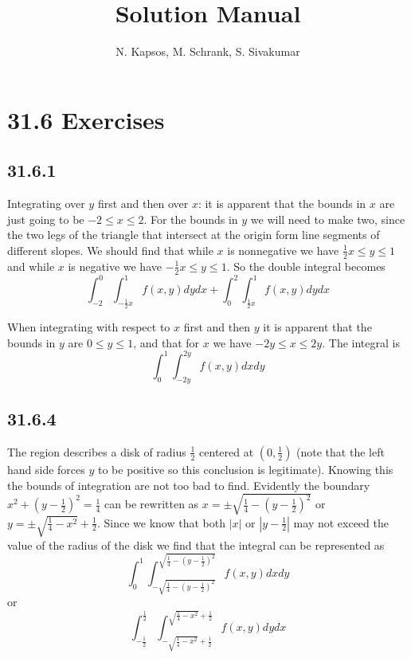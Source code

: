 \documentclass{article}
\title{Solution Manual}
\author{N. Kapsos, M. Schrank, S. Sivakumar}
\date{}
\begin{document}
\maketitle
\setcounter{secnumdepth}{0}

\section{31.6 Exercises}

\subsection{31.6.1}

Integrating over $y$ first and then over $x$: it is apparent that the bounds in $x$ are just going to be $-2\leq x \leq 2$. For the bounds in $y$ we will need to make two, since the two legs of the triangle that intersect at the origin form line segments of different slopes. We should find that while $x$ is nonnegative we have $\frac{1}{2}x \leq y \leq 1$ and while $x$ is negative we have $-\frac{1}{2}x \leq y \leq 1$. So the double integral becomes $$\int_{-2}^{0}\int_{-\frac{1}{2}x}^{1}f(x,y)dydx + \int_{0}^{2}\int_{\frac{1}{2}x}^{1}f(x,y)dydx$$

When integrating with respect to $x$ first and then $y$ it is apparent that the bounds in $y$ are $0\leq y\leq 1$, and that for $x$ we have $-2y\leq x \leq 2y$. The integral is $$\int_0^1\int_{-2y}^{2y}f(x,y)dxdy$$

\subsection{31.6.4}

The region describes a disk of radius $\frac{1}{2}$ centered at $(0,\frac{1}{2})$ (note that the left hand side forces $y$ to be positive so this conclusion is legitimate). Knowing this the bounds of integration are not too bad to find. Evidently the boundary $x^2 + (y-\frac{1}{2})^2 = \frac{1}{4}$ can be rewritten as $x = \pm\sqrt{\frac{1}{4}-(y-\frac{1}{2})^2}$ or $y = \pm\sqrt{\frac{1}{4}-x^2} + \frac{1}{2}$. Since we know that both $|x|$ or $|y-\frac{1}{2}|$ may not exceed the value of the radius of the disk we find that the integral can be represented as $$\int_{0}^{1}\int_{-\sqrt{\frac{1}{4}-(y-\frac{1}{2})^2}}^{\sqrt{\frac{1}{4}-(y-\frac{1}{2})^2}} f(x,y)dxdy$$ or $$\int_{-\frac{1}{2}}^{\frac{1}{2}}\int_{-\sqrt{\frac{1}{4}-x^2} + \frac{1}{2}}^{\sqrt{\frac{1}{4}-x^2} + \frac{1}{2}} f(x,y)dydx$$
\end{document}
